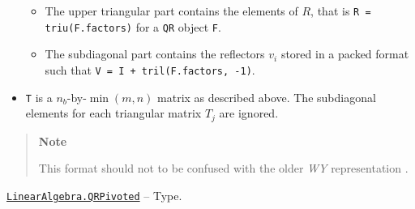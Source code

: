 \begin{adjustwidth}{2em}{0pt}
\begin{itemize}
\begin{itemize}
\item The upper triangular part contains the elements of \(R\), that is \texttt{R = triu(F.factors)} for a \texttt{QR} object \texttt{F}.


\item The subdiagonal part contains the reflectors \(v_i\) stored in a packed format such that \texttt{V = I + tril(F.factors, -1)}.

\end{itemize}

\item \texttt{T} is a \(n_b\)-by-\(\min(m,n)\) matrix as described above. The subdiagonal elements for each triangular matrix \(T_j\) are ignored.

\end{itemize}
\begin{quote}
\textbf{Note}

This format should not to be confused with the older \emph{WY} representation \footnotemark[2].

\end{quote}


\end{adjustwidth}
\hypertarget{1950169381798525185}{} 
\hyperlink{1950169381798525185}{\texttt{LinearAlgebra.QRPivoted}}  -- {Type.}

